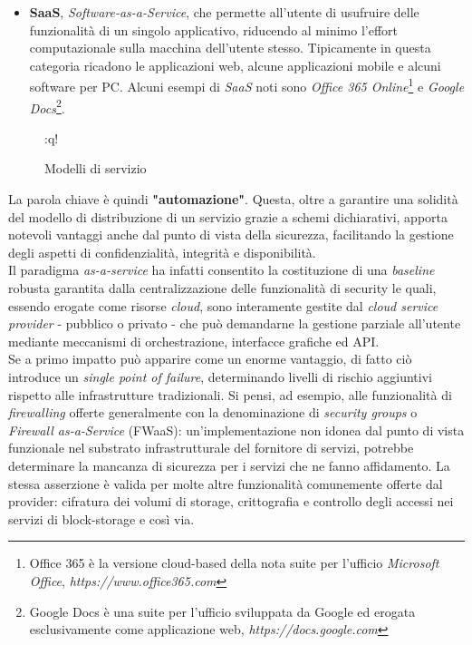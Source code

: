 \documentclass[../main.tex]{subfiles}
\begin{document}
\begin{itemize}
    \item \textbf{SaaS}, \textit{Software-as-a-Service}, che permette all'utente di usufruire delle funzionalità di un singolo applicativo, riducendo al minimo l'effort computazionale sulla macchina dell'utente stesso. Tipicamente in questa categoria ricadono le applicazioni web, alcune applicazioni mobile e alcuni software per PC. Alcuni esempi di \textit{SaaS} noti sono \textit{Office 365 Online}\footnote{Office 365 è la versione cloud-based della nota suite per l'ufficio \textit{Microsoft Office}, \textit{https://www.office365.com}} e \textit{Google Docs}\footnote{Google Docs è una suite per l'ufficio sviluppata da Google ed erogata esclusivamente come applicazione web, \textit{https://docs.google.com}}.
\end{itemize}
\begin{figure}[H]
\centering
{}:q!
\caption{Modelli di servizio}\label{fig:modelliservizio}
\end{figure}




La parola chiave è quindi \textbf{"automazione"}. Questa, oltre a garantire una solidità del modello di distribuzione di un servizio grazie a schemi dichiarativi, apporta notevoli vantaggi anche dal punto di vista della sicurezza, facilitando la gestione degli aspetti di confidenzialità, integrità e disponibilità.
\\Il paradigma \textit{as-a-service} ha infatti consentito la costituzione di una \textit{baseline} robusta garantita dalla centralizzazione delle funzionalità di security le quali, essendo erogate come risorse \textit{cloud}, sono interamente gestite dal \textit{cloud service provider} - pubblico o privato - che può demandarne la gestione parziale all'utente mediante meccanismi di orchestrazione, interfacce grafiche ed API.
\\Se a primo impatto può apparire come un enorme vantaggio, di fatto ciò introduce un \textit{single point of failure}, determinando livelli di rischio aggiuntivi rispetto alle infrastrutture tradizionali. Si pensi, ad esempio, alle funzionalità di \textit{firewalling} offerte generalmente con la denominazione di \textit{security groups} o \textit{Firewall as-a-Service} (FWaaS): un'implementazione non idonea dal punto di vista funzionale nel substrato infrastrutturale del fornitore di servizi, potrebbe determinare la mancanza di sicurezza per i servizi che ne fanno affidamento.
La stessa asserzione è valida per molte altre funzionalità comunemente offerte dal provider: cifratura dei volumi di storage, crittografia e controllo degli accessi nei servizi di block-storage e così via.
\end{document}
